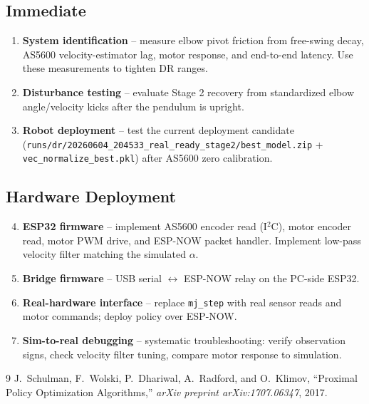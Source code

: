 \documentclass[12pt,a4paper]{article}
\begin{document}
\subsection{Immediate}
\begin{enumerate}
    \item \textbf{System identification} -- measure elbow pivot friction from
          free-swing decay, AS5600 velocity-estimator lag, motor response, and
          end-to-end latency.  Use these measurements to tighten DR ranges.
    \item \textbf{Disturbance testing} -- evaluate Stage 2 recovery from
          standardized elbow angle/velocity kicks after the pendulum is upright.
    \item \textbf{Robot deployment} -- test the current deployment candidate
          (\texttt{runs/dr/20260604\_204533\_real\_ready\_stage2/best\_model.zip} +
          \texttt{vec\_normalize\_best.pkl}) after AS5600 zero calibration.
\end{enumerate}

\subsection{Hardware Deployment}
\begin{enumerate}
    \setcounter{enumi}{3}
    \item \textbf{ESP32 firmware} -- implement AS5600 encoder read (I$^2$C),
          motor encoder read, motor PWM drive, and ESP-NOW packet handler.
          Implement low-pass velocity filter matching the simulated $\alpha$.
    \item \textbf{Bridge firmware} -- USB serial $\leftrightarrow$ ESP-NOW
          relay on the PC-side ESP32.
    \item \textbf{Real-hardware interface} -- replace \texttt{mj\_step} with
          real sensor reads and motor commands; deploy policy over ESP-NOW.
    \item \textbf{Sim-to-real debugging} -- systematic troubleshooting:
          verify observation signs, check velocity filter tuning, compare
          motor response to simulation.
\end{enumerate}

\begin{thebibliography}{9}
J.~Schulman, F.~Wolski, P.~Dhariwal, A.~Radford, and O.~Klimov,
``Proximal Policy Optimization Algorithms,''
\textit{arXiv preprint arXiv:1707.06347}, 2017.
\end{thebibliography}
\end{document}
